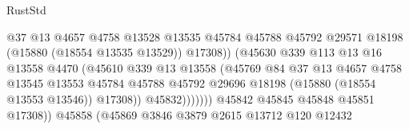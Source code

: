 \begin{lexlean}{RustStd}
\begin{coremodule}
                                              @37
                                              @13
                                              @4657
                                              @4758
                                              @13528
                                              @13535
                                              @45784
                                              @45788
                                              @45792
                                              @29571
                                              @18198
                                              (@15880 (@18554 @13535 @13529))
                                              @17308))
                                          (@45630
                                            @339
                                            @113
                                            @13
                                            @16
                                            @13558
                                            @4470
                                            (@45610
                                              @339
                                              @13
                                              @13558
                                              (@45769
                                                @84
                                                @37
                                                @13
                                                @4657
                                                @4758
                                                @13545
                                                @13553
                                                @45784
                                                @45788
                                                @45792
                                                @29696
                                                @18198
                                                (@15880 (@18554 @13553 @13546))
                                                @17308))
                                            @45832)))))))
                              @45842
                              @45845
                              @45848
                              @45851
                              @17308))
                          @45858
                          (@45869
                            @3846
                            @3879
                            @2615
                            @13712
                            @120
                            @12432

\end{coremodule}
\end{lexlean}
